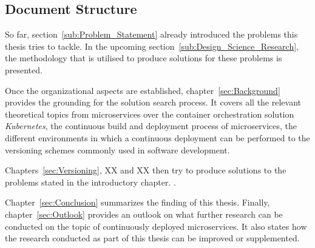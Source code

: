 
\subsection{Document Structure}%
\label{sub:Document Structure}

So far, section~\ref{sub:Problem_Statement} already introduced the problems
this thesis tries to tackle. In the upcoming
section~\ref{sub:Design_Science_Research}, the methodology that is utilised to
produce solutions for these problems is presented.

Once the organizational aspects are established, chapter~\ref{sec:Background}
provides the grounding for the solution search process. It covers all the
relevant theoretical topics from microservices over the container orchestration
solution \textit{Kubernetes}, the continuous build and deployment process of
microservices, the different environments in which a continuous deployment can
be performed to the versioning schemes commonly used in software development.

 Chapters~\ref{sec:Versioning}, XX and XX then
try to produce solutions to the problems stated in the introductory chapter.
.

Chapter~\ref{sec:Conclusion} summarizes the finding of this thesis. Finally,
chapter~\ref{sec:Outlook} provides an outlook on what further research can be
conducted on the topic of continuously deployed microservices. It also states
how the research conducted as part of this thesis can be improved or
supplemented.
